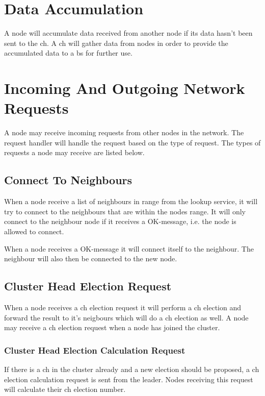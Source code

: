 \documentclass[USenglish]{uit-thesis}
\begin{document}
\section{Data Accumulation}
A node will accumulate data received from another node if its data hasn't been sent to the \gls{ch}. A \gls{ch} will gather data from nodes in order to provide the accumulated data to a \gls{bs} for further use.


\section{Incoming And Outgoing Network Requests}
A node may receive incoming requests from other nodes in the network. The request handler will handle the request based on the type of request. The types of requests a node may receive are listed below.

\subsection{Connect To Neighbours}
When a node receive a list of neighbours in range from the lookup service, it will try to connect to the neighbours that are within the nodes range. It will only connect to the neighbour node if it receives a OK-message, i.e. the node is allowed to connect.

When a node receives a OK-message it will connect itself to the neighbour. The neighbour will also then be connected to the new node.

\subsection{Cluster Head Election Request}
When a node receives a \gls{ch} election request it will perform a \gls{ch} election and forward the result to it's neigbours which will do a \gls{ch} election as well.
A node may receive a \gls{ch} election request when a node has joined the cluster.

\subsubsection{Cluster Head Election Calculation Request}
If there is a \gls{ch} in the cluster already and a new election should be proposed, a \gls{ch} election calculation request is sent from the leader. Nodes receiving this request will calculate their \gls{ch} election number. %
\end{document}
